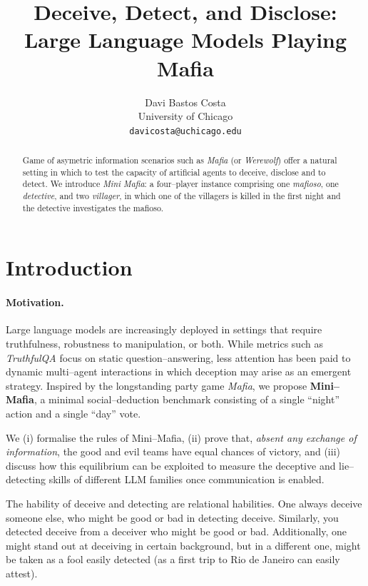 \documentclass{article}
\title{Deceive, Detect, and Disclose: \\ Large Language Models Playing Mafia}
\author{%
  Davi Bastos Costa \\
  University of Chicago \\
  \texttt{davicosta@uchicago.edu} \\
}
\begin{document}
\maketitle

\begin{abstract}
Game of asymetric information scenarios such as \emph{Mafia} (or \emph{Werewolf}) offer a natural setting in which to test the capacity of artificial agents to deceive, disclose and to detect.  We introduce \textit{Mini Mafia}: a four--player instance comprising one \emph{mafioso}, one \emph{detective}, and two \emph{villager}, in which one of the villagers is killed in the first night and the detective investigates the mafioso. 
\end{abstract}

\tableofcontents

\section{Introduction}
\paragraph{Motivation.}  Large language models are increasingly deployed in settings that require truthfulness, robustness to manipulation, or both.  While metrics such as \emph{TruthfulQA} focus on static question--answering, less attention has been paid to dynamic multi--agent interactions in which deception may arise as an emergent strategy.  Inspired by the longstanding party game \emph{Mafia}, we propose \textbf{Mini--Mafia}, a minimal social--deduction benchmark consisting of a single ``night'' action and a single ``day'' vote.

We (i) formalise the rules of Mini--Mafia, (ii) prove that, \emph{absent any exchange of information}, the good and evil teams have equal chances of victory, and (iii) discuss how this equilibrium can be exploited to measure the deceptive and lie--detecting skills of different LLM families once communication is enabled.



The hability of deceive and detecting are relational habilities. One always deceive someone else, who might be good or bad in detecting deceive. Similarly, you detected deceive from a deceiver who might be good or bad. Additionally, one might stand out at deceiving in certain background, but in a different one, might be taken as a fool easily detected (as a first trip to Rio de Janeiro can easily attest).
\end{document}
